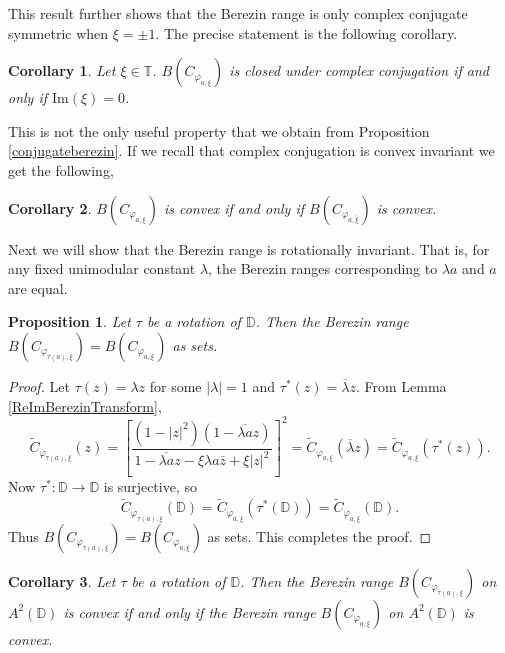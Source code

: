 \documentclass{amsart}
\newtheorem{proposition}{Proposition}
\newtheorem{corollary}{Corollary}
\theoremstyle{remark}
\begin{document}
This result further shows that the Berezin range is only complex conjugate symmetric when $\xi = \pm 1$. The precise statement is the following corollary.
\begin{corollary}\label{propconj}
Let $\xi \in \mathbb{T}$.  $B(C_{\varphi_{a,\xi}})$ is closed under complex conjugation if and only if $\mathrm{Im}(\xi) = 0$.
\end{corollary}
This is not the only useful property that we obtain from Proposition \ref{conjugateberezin}. If we recall that complex conjugation is convex invariant we get the following,
\begin{corollary}\label{propconvex}
    $B(C_{\varphi_{a,\xi}})$ is convex if and only if $B(C_{\varphi_{a,\overline{\xi}}})$ is convex.
\end{corollary}
Next we will show that the Berezin range is rotationally invariant.  That is, for any fixed unimodular constant $\lambda$, the Berezin ranges corresponding to $\lambda a$ and $a$ are equal.
\begin{proposition}\label{auto_on_disk}
    Let $\tau$ be a rotation of $\mathbb{D}$.  Then the Berezin range $B(C_{\varphi_{\tau(a),\xi}})=B(C_{\varphi_{a,\xi}})$ as sets. 
\end{proposition}
\begin{proof}
Let $\tau(z)=\lambda z$ for some $|\lambda|=1$ and $\tau^*(z)=\overline{\lambda}z$. From Lemma \ref{ReImBerezinTransform},
\[\widetilde{C}_{\varphi_{\tau(a),\xi}}(z)=\left[\dfrac{(1-|z|^2)(1-\overline{\lambda a}z)}{1-\overline{\lambda a}z-\xi \lambda a\overline{z}+\xi|z|^2}\right]^2=\widetilde{C}_{\varphi_{a,\xi}}(\overline{\lambda}z)=\widetilde{C}_{\varphi_{a,\xi}}(\tau^*(z)).\]
Now $\tau^*:\mathbb{D}\to \mathbb{D} $ is surjective, so 
\[\widetilde{C}_{\varphi_{\tau(a),\xi}}(\mathbb{D})=\widetilde{C}_{\varphi_{a,\xi}}(\tau^*(\mathbb{D}))=\widetilde{C}_{\varphi_{a,\xi}}(\mathbb{D}).\]  Thus $B(C_{\varphi_{\tau(a),\xi}})=B(C_{\varphi_{a,\xi}})$ as sets.
This completes the proof.
\end{proof}
\begin{corollary}\label{auto_on_disk2}
    Let $\tau$ be a rotation of $\mathbb{D}$.  Then the Berezin range $B(C_{\varphi_{\tau(a),\xi}})$ on $A^2(\mathbb{D})$ is convex if and only if the Berezin range $B(C_{\varphi_{a,\xi}})$ on $A^2(\mathbb{D})$ is convex.
\end{corollary}
\end{document}
